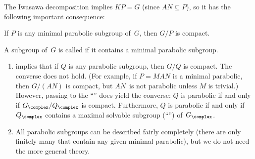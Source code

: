 The Iwasawa decomposition implies $KP = G$ (since $AN \subseteq P$), so it has the following important consequence:

\begin{cor} \label{G/Pcpct}
If $P$ is any minimal parabolic subgroup of~$G$, then $G/P$ is compact.
\end{cor}

\begin{rem} \label{ParabRem}
A subgroup of~$G$ is called  if it contains a minimal parabolic subgroup. 
	\begin{enumerate}

	\item \label{ParabRem-cocpct}
	 implies that if $Q$ is any parabolic subgroup, then $G/Q$ is compact. The converse
does not hold. (For example, if $P = MAN$ is a minimal
parabolic, then $G/(AN)$ is compact, but $AN$~is not
parabolic unless $M$ is trivial.) However, passing to the
``'' does yield the converse: $Q$ is parabolic if
and only if $G_{\complex}/Q_{\complex}$ is compact.
Furthermore, $Q$ is parabolic if and only if $Q_{\complex}$
contains a maximal solvable subgroup (``'') of~$G_{\complex}$.

	\item All parabolic subgroups can be described fairly completely (there are only finitely many that contain any given minimal parabolic), but we do not need the more general theory.
	\end{enumerate}
 \end{rem}

